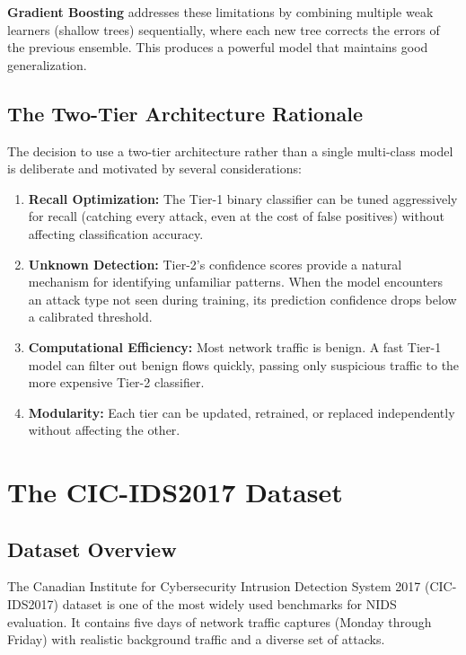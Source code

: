 \documentclass[12pt,a4paper,twoside]{report}
\begin{document}
\textbf{Gradient Boosting} addresses these limitations by combining multiple weak learners (shallow trees) sequentially, where each new tree corrects the errors of the previous ensemble. This produces a powerful model that maintains good generalization.

\subsection{The Two-Tier Architecture Rationale}

The decision to use a two-tier architecture rather than a single multi-class model is deliberate and motivated by several considerations:

\begin{enumerate}[leftmargin=*]
    \item \textbf{Recall Optimization:} The Tier-1 binary classifier can be tuned aggressively for recall (catching every attack, even at the cost of false positives) without affecting classification accuracy.
    \item \textbf{Unknown Detection:} Tier-2's confidence scores provide a natural mechanism for identifying unfamiliar patterns. When the model encounters an attack type not seen during training, its prediction confidence drops below a calibrated threshold.
    \item \textbf{Computational Efficiency:} Most network traffic is benign. A fast Tier-1 model can filter out benign flows quickly, passing only suspicious traffic to the more expensive Tier-2 classifier.
    \item \textbf{Modularity:} Each tier can be updated, retrained, or replaced independently without affecting the other.
\end{enumerate}

\section{The CIC-IDS2017 Dataset}

\subsection{Dataset Overview}

The Canadian Institute for Cybersecurity Intrusion Detection System 2017 (CIC-IDS2017) dataset is one of the most widely used benchmarks for NIDS evaluation. It contains five days of network traffic captures (Monday through Friday) with realistic background traffic and a diverse set of attacks.
\end{document}
